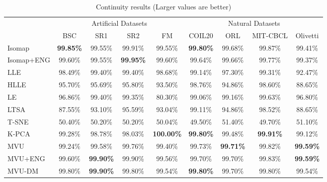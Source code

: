         \begin{table}[t]
        \caption{Continuity results (Larger values are better)}
        \label{tab:continuity}
        \begin{center}
        \begin{tabular}{|l|c|c|c|c||c|c|c|c|}
        \hline
        \multicolumn{1}{|c|}{} & \multicolumn{4}{c||}{Artificial Datasets} & \multicolumn{4}{c|}{Natural Datasets} \\
                            & BSC & SR1 & SR2 & FM & COIL20 & ORL & MIT-CBCL & Olivetti \\
        \hline
        Isomap            & \textbf{99.85\%} & 99.55\% & 99.91\% & 99.55\% & \textbf{99.80\%} & 99.68\% & 99.87\% & 99.41\% \\
        Isomap+ENG            & 99.60\% & 99.55\% & \textbf{99.95\%} & 99.60\% & 99.64\% & 99.66\% & 99.77\% & 99.37\% \\
        LLE            & 98.49\% & 99.40\% & 99.40\% & 98.68\% & 99.14\% & 97.30\% & 99.31\% & 92.47\% \\
        HLLE            & 95.70\% & 95.69\% & 95.80\% & 93.50\% & 98.76\% & 94.86\% & 98.60\% & 88.65\% \\
        LE            & 96.86\% & 99.40\% & 99.35\% & 80.30\% & 99.06\% & 99.16\% & 99.63\% & 96.80\% \\
        LTSA            & 87.55\% & 93.10\% & 95.59\% & 93.04\% & 99.11\% & 94.86\% & 98.52\% & 88.65\% \\
        T-SNE            & 50.40\% & 50.20\% & 50.20\% & 50.04\% & 49.50\% & 51.40\% & 49.70\% & 51.10\% \\
        K-PCA            & 99.28\% & 98.78\% & 98.03\% & \textbf{100.00\%} & \textbf{99.80\%} & 99.48\% & \textbf{99.91\%} & 99.12\% \\
        \hline
        MVU            & 99.24\% & 99.58\% & 99.76\% & 99.40\% & 99.73\% & \textbf{99.71\%} & 99.82\% & \textbf{99.59\%} \\
        MVU+ENG            & 99.60\% & \textbf{99.90\%} & 99.90\% & 99.56\% & 99.70\% & 99.70\% & 99.83\% & \textbf{99.59\%} \\
        MVU-DM            & 99.80\% & \textbf{99.90\%} & 99.80\% & 99.54\% & \textbf{99.80\%} & 99.70\% & 99.80\% & 99.54\% \\
        \hline
        \end{tabular}
        \end{center}
        \end{table}




